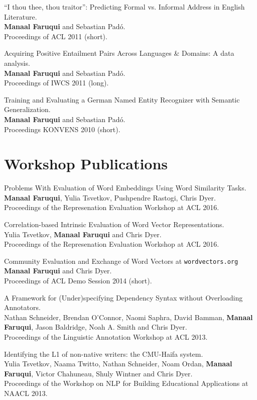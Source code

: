 \documentclass[margin,line]{res}
\begin{document}
\begin{resume}
``I thou thee, thou traitor'': Predicting Formal vs. Informal Address in English Literature.\\
\textbf{Manaal Faruqui} and Sebastian Pad\'{o}.\\
Proceedings of ACL 2011 (short).

Acquiring Positive Entailment Pairs Across Languages \& Domains: A data analysis.\\
\textbf{Manaal Faruqui} and Sebastian Pad\'{o}.\\
Proceedings of IWCS 2011 (long).

Training and Evaluating a German Named Entity Recognizer with Semantic Generalization.\\
\textbf{Manaal Faruqui} and Sebastian Pad\'{o}.\\
Proceedings KONVENS 2010 (short).

\section{\sc Workshop Publications}

Problems With Evaluation of Word Embeddings Using Word Similarity Tasks.\\
\textbf{Manaal Faruqui}, Yulia Tsvetkov, Pushpendre Rastogi, Chris Dyer.\\
Proceedings of the Represenation Evaluation Workshop at ACL 2016.

Correlation-based Intrinsic Evaluation of Word Vector Representations.\\
Yulia Tsvetkov, \textbf{Manaal Faruqui} and Chris Dyer.\\
Proceedings of the Represenation Evaluation Workshop at ACL 2016.

Community Evaluation and Exchange of Word Vectors at \texttt{wordvectors.org}\\
\textbf{Manaal Faruqui} and Chris Dyer.\\
Proceedings of ACL Demo Session 2014 (short).

A Framework for (Under)specifying Dependency Syntax without Overloading Annotators.\\
Nathan Schneider, Brendan O'Connor, Naomi Saphra, David Bamman, \textbf{Manaal Faruqui}, Jason Baldridge, Noah A. Smith and Chris Dyer.\\
Proceedings of the Linguistic Annotation Workshop at ACL 2013.

Identifying the L1 of non-native writers: the CMU-Haifa system.\\
Yulia Tsvetkov, Naama Twitto, Nathan Schneider, Noam Ordan, \textbf{Manaal Faruqui}, Victor Chahuneau, Shuly Wintner and Chris Dyer.\\
Proceedings of the Workshop on NLP for Building Educational Applications at NAACL 2013.


\end{resume}
\end{document}
